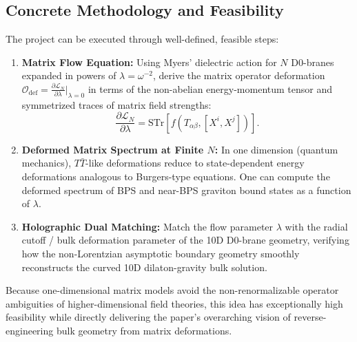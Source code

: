 \documentclass[11pt,a4paper]{article}
\begin{document}
\subsection*{Concrete Methodology and Feasibility}
The project can be executed through well-defined, feasible steps:
\begin{enumerate}
    \item \textbf{Matrix Flow Equation:} 
    Using Myers' dielectric action for $N$ D0-branes expanded in powers of $\lambda = \omega^{-2}$, derive the matrix operator deformation $\mathcal{O}_{\text{def}} = \frac{\partial \mathcal{L}_N}{\partial \lambda}\big|_{\lambda=0}$ in terms of the non-abelian energy-momentum tensor and symmetrized traces of matrix field strengths:
    \begin{equation}
        \frac{\partial \mathcal{L}_N}{\partial \lambda} = \mathrm{STr} \left[ f\left( T_{\alpha\beta}, [X^i, X^j] \right) \right].
    \end{equation}
    
    \item \textbf{Deformed Matrix Spectrum at Finite $N$:} 
    In one dimension (quantum mechanics), $T\bar{T}$-like deformations reduce to state-dependent energy deformations analogous to Burgers-type equations. One can compute the deformed spectrum of BPS and near-BPS graviton bound states as a function of $\lambda$.
    
    \item \textbf{Holographic Dual Matching:} 
    Match the flow parameter $\lambda$ with the radial cutoff / bulk deformation parameter of the 10D D0-brane geometry, verifying how the non-Lorentzian asymptotic boundary geometry smoothly reconstructs the curved 10D dilaton-gravity bulk solution.
\end{enumerate}
Because one-dimensional matrix models avoid the non-renormalizable operator ambiguities of higher-dimensional field theories, this idea has exceptionally high feasibility while directly delivering the paper's overarching vision of reverse-engineering bulk geometry from matrix deformations.
\end{document}
